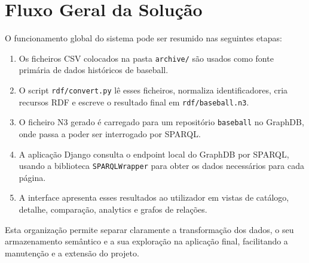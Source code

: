 \section{Fluxo Geral da Solu\c{c}\~ao}

O funcionamento global do sistema pode ser resumido nas seguintes etapas:

\begin{enumerate}[leftmargin=*]
  \item Os ficheiros CSV colocados na pasta \texttt{archive/} s\~ao usados como fonte prim\'aria de dados hist\'oricos de baseball.
  \item O script \texttt{rdf/convert.py} l\^e esses ficheiros, normaliza identificadores, cria recursos RDF e escreve o resultado final em \texttt{rdf/baseball.n3}.
  \item O ficheiro N3 gerado \'{e} carregado para um reposit\'orio \texttt{baseball} no GraphDB, onde passa a poder ser interrogado por SPARQL.
  \item A aplica\c{c}\~ao Django consulta o endpoint local do GraphDB por SPARQL, usando a biblioteca \texttt{SPARQLWrapper} para obter os dados necess\'arios para cada p\'agina.
  \item A interface apresenta esses resultados ao utilizador em vistas de cat\'alogo, detalhe, compara\c{c}\~ao, analytics e grafos de rela\c{c}\~oes.
\end{enumerate}

Esta organiza\c{c}\~ao permite separar claramente a transforma\c{c}\~ao dos dados, o seu armazenamento sem\^antico e a sua explora\c{c}\~ao na aplica\c{c}\~ao final, facilitando a manuten\c{c}\~ao e a extens\~ao do projeto.
